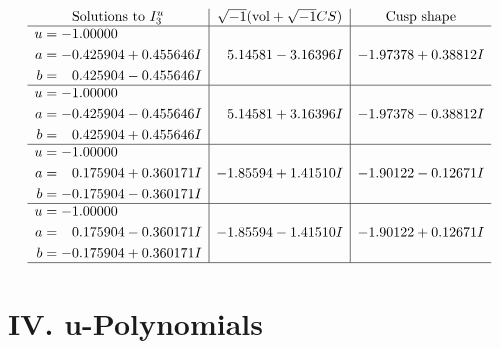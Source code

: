 \documentclass[1p]{elsarticle_modified}
\theoremstyle{definition}
\newcommand{\I}{\sqrt{-1}}
\begin{document}
$$\begin{array}{c|c|c}  
\text{Solutions to }I^u_{3}& \I (\text{vol} + \sqrt{-1}CS) & \text{Cusp shape}\\
 \hline 
\begin{aligned}
u &= -1.00000\phantom{ +0.000000I} \\
a &= -0.425904 + 0.455646 I \\
b &= \phantom{-}0.425904 - 0.455646 I\end{aligned}
 & \phantom{-}5.14581 - 3.16396 I & -1.97378 + 0.38812 I \\ \hline\begin{aligned}
u &= -1.00000\phantom{ +0.000000I} \\
a &= -0.425904 - 0.455646 I \\
b &= \phantom{-}0.425904 + 0.455646 I\end{aligned}
 & \phantom{-}5.14581 + 3.16396 I & -1.97378 - 0.38812 I \\ \hline\begin{aligned}
u &= -1.00000\phantom{ +0.000000I} \\
a &= \phantom{-}0.175904 + 0.360171 I \\
b &= -0.175904 - 0.360171 I\end{aligned}
 & -1.85594 + 1.41510 I & -1.90122 - 0.12671 I \\ \hline\begin{aligned}
u &= -1.00000\phantom{ +0.000000I} \\
a &= \phantom{-}0.175904 - 0.360171 I \\
b &= -0.175904 + 0.360171 I\end{aligned}
 & -1.85594 - 1.41510 I & -1.90122 + 0.12671 I\\
 \hline 
 \end{array}$$\newpage
\newpage\renewcommand{\arraystretch}{1}
\centering \section*{ IV. u-Polynomials}
\end{document}
